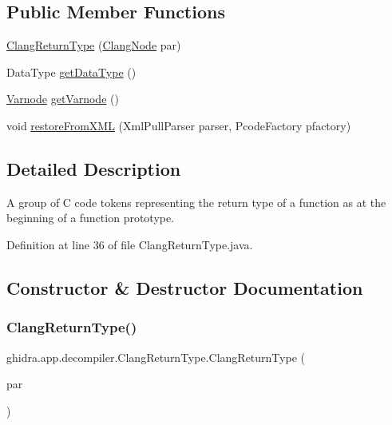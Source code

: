 \subsection*{Public Member Functions}
\begin{DoxyCompactItemize}
\item 
\mbox{\hyperlink{classghidra_1_1app_1_1decompiler_1_1_clang_return_type_a465fc5f221a8efa0292b7a107b439c94}{Clang\+Return\+Type}} (\mbox{\hyperlink{interfaceghidra_1_1app_1_1decompiler_1_1_clang_node}{Clang\+Node}} par)
\item 
Data\+Type \mbox{\hyperlink{classghidra_1_1app_1_1decompiler_1_1_clang_return_type_a3aff7f2d2da04f3d65ba7593bae01c85}{get\+Data\+Type}} ()
\item 
\mbox{\hyperlink{class_varnode}{Varnode}} \mbox{\hyperlink{classghidra_1_1app_1_1decompiler_1_1_clang_return_type_abc6aa2dfbf61e78a9950a82ccfaba62f}{get\+Varnode}} ()
\item 
void \mbox{\hyperlink{classghidra_1_1app_1_1decompiler_1_1_clang_return_type_a5bdc24c2df8e80697cec876a033fc222}{restore\+From\+X\+ML}} (Xml\+Pull\+Parser parser, Pcode\+Factory pfactory)
\end{DoxyCompactItemize}


\subsection{Detailed Description}
A group of C code tokens representing the return type of a function as at the beginning of a function prototype. 

Definition at line 36 of file Clang\+Return\+Type.\+java.



\subsection{Constructor \& Destructor Documentation}
\mbox{\label{classghidra_1_1app_1_1decompiler_1_1_clang_return_type_a465fc5f221a8efa0292b7a107b439c94}} 
\subsubsection{\texorpdfstring{ClangReturnType()}{ClangReturnType()}}
{\footnotesize\ttfamily ghidra.\+app.\+decompiler.\+Clang\+Return\+Type.\+Clang\+Return\+Type (\begin{DoxyParamCaption}\item[{\mbox{\hyperlink{interfaceghidra_1_1app_1_1decompiler_1_1_clang_node}{Clang\+Node}}}]{par }\end{DoxyParamCaption})\hspace{0.3cm}{\ttfamily [inline]}}



